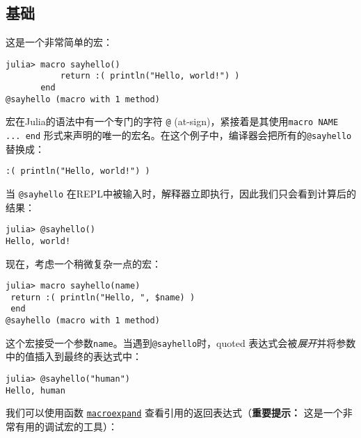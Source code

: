 \hypertarget{13022711559815737661}{}


\subsection{基础}



这是一个非常简单的宏：




\begin{verbatim}
julia> macro sayhello()
           return :( println("Hello, world!") )
       end
@sayhello (macro with 1 method)
\end{verbatim}



宏在Julia的语法中有一个专门的字符 \texttt{@} (at-sign)，紧接着是其使用\texttt{macro NAME ... end} 形式来声明的唯一的宏名。在这个例子中，编译器会把所有的\texttt{@sayhello} 替换成：




\begin{verbatim}
:( println("Hello, world!") )
\end{verbatim}



当 \texttt{@sayhello} 在REPL中被输入时，解释器立即执行，因此我们只会看到计算后的结果：




\begin{verbatim}
julia> @sayhello()
Hello, world!
\end{verbatim}



现在，考虑一个稍微复杂一点的宏：




\begin{verbatim}
julia> macro sayhello(name)
 return :( println("Hello, ", $name) )
 end
@sayhello (macro with 1 method)
\end{verbatim}



这个宏接受一个参数\texttt{name}。当遇到\texttt{@sayhello}时，quoted 表达式会被\emph{展开}并将参数中的值插入到最终的表达式中：




\begin{verbatim}
julia> @sayhello("human")
Hello, human
\end{verbatim}



我们可以使用函数 \hyperlink{8018172489611994488}{\texttt{macroexpand}} 查看引用的返回表达式（\textbf{重要提示：} 这是一个非常有用的调试宏的工具）：





